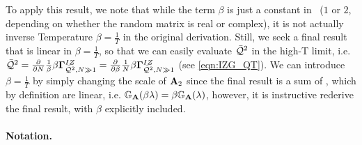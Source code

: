 To apply this result, we note that
while the term $\beta$ is just a constant in~\cite{Tanaka2008}
($1$ or $2$, depending on whether the random matrix is real or complex),
it is not actually inverse Temperature $\beta=\tfrac{1}{T}$ in the original derivation.
Still, we seek a final result that is linear in $\beta=\tfrac{1}{T}$,
so that we can easily evaluate $\bar{\mathcal{Q}}^{2}$ in the high-T limit, i.e.
$\bar{\mathcal{Q}}^{2}
=\tfrac{\partial}{\partial N}\tfrac{1}{\beta}\beta\mathbf{\Gamma}^{IZ}_{\bar{\mathcal{Q}}^{2},N\gg 1}
=\tfrac{\partial}{\partial \beta}\tfrac{1}{N}\beta\mathbf{\Gamma}^{IZ}_{\bar{\mathcal{Q}}^{2},N\gg 1}$
(see \ref{eqn:IZG_QT}).
We can introduce $\beta=\tfrac{1}{T}$ by
simply changing the scale of $\mathbf{A}_{2}$ since the final result is a sum of \RTransforms, which by definition
are linear, i.e. $\mathbb{G}_{\mathbf{A}}(\beta\lambda)=\beta \mathbb{G}_{\mathbf{A}}(\lambda)$, however, it is instructive
rederive the final result, with $\beta$ explicitly included.


\paragraph{Notation.}

